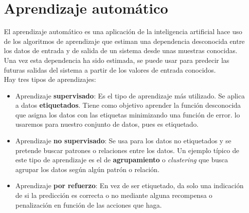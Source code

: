 
\chapter{Aprendizaje automático}\label{ch:machine-learning}
El aprendizaje automático es una aplicación de la inteligencia artificial hace uso de los algoritmos de aprendizaje que estiman una dependencia desconocida entre los datos de entrada y de salida de un sistema desde unas muestras conocidas. Una vez esta dependencia ha sido estimada, se puede usar para predecir las futuras salidas del sistema a partir de los valores de entrada conocidos.\\
Hay tres tipos de aprendizajes:
\begin{itemize}
  \item Aprendizaje \textbf{supervisado}: Es el tipo de aprendizaje más utilizado. Se aplica a datos \textbf{etiquetados}. Tiene como objetivo aprender la función desconocida que asigna los datos con las etiquetas minimizando una función de error. lo usaremos para nuestro conjunto de datos, pues es etiquetado.
  \item Aprendizaje \textbf{no supervisado}: Se usa para los datos no etiquetados y se pretende buscar patrones o relaciones entre los datos. Un ejemplo típico de este tipo de aprendizaje es el de \textbf{agrupamiento} o \textit{clustering} que busca agrupar los datos según algún patrón o relación.
  \item Aprendizaje \textbf{por refuerzo}: En vez de ser etiquetado, da solo una indicación de si la predicción es correcta o no mediante alguna recompensa o penalización en función de las acciones que haga.
\end{itemize}
\cite{jordan2015machine}\\
